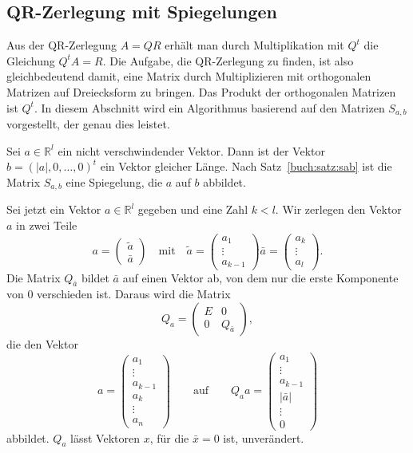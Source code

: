 %
%
\subsection{QR-Zerlegung mit Spiegelungen
\label{buch:subsection:qrspiegelungen}}
Aus der QR-Zerlegung $A=QR$ erhält man durch Multiplikation mit $Q^t$
die Gleichung $Q^tA=R$.
Die Aufgabe, die QR-Zerlegung zu finden, ist also gleichbedeutend damit,
eine Matrix durch Multiplizieren mit orthogonalen Matrizen auf Dreiecksform
zu bringen.
Das Produkt der orthogonalen Matrizen ist $Q^t$.
In diesem Abschnitt wird ein Algorithmus basierend auf den Matrizen
$S_{a,b}$ vorgestellt, der genau dies leistet.

Sei $a\in\mathbb R^l$ ein nicht verschwindender Vektor.
Dann ist der Vektor $b=(|a|,0,\dots,0)^t$ ein Vektor gleicher Länge.
Nach Satz~\ref{buch:satz:sab} ist die Matrix $S_{a,b}$ eine Spiegelung,
die $a$ auf $b$ abbildet.

Sei jetzt ein Vektor $a\in\mathbb R^l$ gegeben und eine Zahl $k< l$.
Wir zerlegen den Vektor $a$ in zwei Teile
\[
a = \begin{pmatrix}\tilde{a}\\\bar{a}\end{pmatrix}
\quad\text{mit}\quad
\tilde{a}=\begin{pmatrix}a_1\\\vdots\\a_{k-1}\end{pmatrix}
\bar{a}=\begin{pmatrix}a_k\\\vdots \\a_l\end{pmatrix}.
\]
Die Matrix $Q_{\bar{a}}$ bildet $\bar{a}$ auf einen Vektor ab, von dem
nur die erste Komponente von $0$ verschieden ist.
Daraus wird die Matrix
\begin{equation}
Q_a
=
\begin{pmatrix} E&0\\0&Q_{\bar{a}}\end{pmatrix},
\label{buch:eqn:Qa}
\end{equation}
die den Vektor
\[
a=\begin{pmatrix}
a_1\\\vdots\\ a_{k-1}\\a_{k}\\\vdots\\a_n
\end{pmatrix}
\qquad\text{auf}\qquad
Q_aa
=
\begin{pmatrix}a_1\\\vdots\\a_{k-1}\\ |\bar{a}|\\\vdots\\0\end{pmatrix}
\]
abbildet.
$Q_a$ lässt Vektoren $x$, für die $\bar{x}=0$ ist, unverändert.

